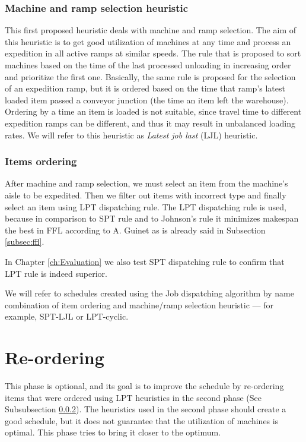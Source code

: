 \documentclass{ctuthesis}
\begin{document}
\subsubsection{Machine and ramp selection heuristic }

This first proposed heuristic deals with machine and ramp selection.
The aim of this heuristic is to get good utilization of machines at any time and process an expedition in all active ramps at similar speeds. The rule that is proposed to sort machines based on the time of the last processed unloading in increasing order and prioritize the first one. 
Basically, the same rule is proposed for the selection of an expedition ramp, but it is ordered based on the time that ramp's latest loaded item passed a conveyor junction (the time an item left the warehouse). Ordering by a time an item is loaded is not suitable, since travel time to different expedition ramps can be different, and thus it may result in unbalanced loading rates. We will refer to this heuristic as \emph{Latest job last} (LJL) heuristic.

\subsubsection{Items ordering}
\label{subsubsec:itemsordering}

After machine and ramp selection, we must select an item from the machine's aisle to be expedited. Then we filter out items with incorrect type and finally select an item using LPT dispatching rule. The LPT dispatching rule is used, because in comparison to SPT rule and to Johnson's rule it minimizes makespan the best in FFL according to A. Guinet \cite{guinet} as is already said in Subsection \ref{subsec:ffl}.

In Chapter \ref{ch:Evaluation} we also test SPT dispatching rule to confirm that LPT rule is indeed superior. 

We will refer to schedules created using the Job dispatching algorithm by name combination of item ordering and machine/ramp selection heuristic — for example, SPT-LJL or LPT-cyclic.

\section{Re-ordering}
\label{sec:reordering}
This phase is optional, and its goal is to improve the schedule by re-ordering items that were ordered using LPT heuristics in the second phase (See Subsubsection \ref{subsubsec:itemsordering}). The heuristics used in the second phase should create a good schedule, but it does not guarantee that the utilization of machines is optimal. This phase tries to bring it closer to the optimum.
\end{document}
